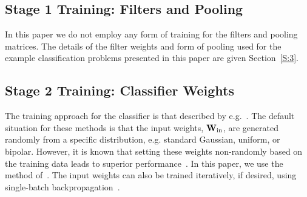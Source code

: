 \documentclass[conference]{IEEEtran}
\begin{document}
\subsection{Stage 1 Training: Filters and Pooling}

In this paper we do not employ any form of training for the filters and pooling matrices. The details of the filter weights and form of pooling used for the example classification problems presented in this paper are given Section~\ref{S:3}.

\subsection{Stage 2 Training: Classifier Weights}

The  training approach for the classifier is that described by  e.g.~\cite{Schmidt.92,Chen.96,Eliasmith,Huang.14}. The default situation for these methods is that the input weights, ${\bf W}_{\rm in}$, are generated randomly from a specific distribution, e.g. standard Gaussian, uniform, or bipolar. However, it is known that setting these weights non-randomly based on the training data leads to superior performance~\cite{McDonnell.15PLOS,Tapson.14,Zhu.15}. In this paper, we use the method of~\cite{Zhu.15}.  The input weights can also be trained iteratively, if desired, using single-batch  backpropagation~\cite{Yu.12}.
\end{document}

